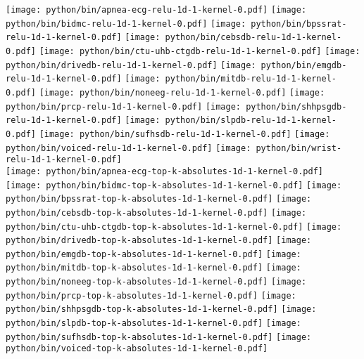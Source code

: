 \documentclass[journal]{IEEEtran}
\begin{document}
\begin{figure*}[!t]
	\centering
	\texttt{[image: python/bin/apnea-ecg-relu-1d-1-kernel-0.pdf]}
	\texttt{[image: python/bin/bidmc-relu-1d-1-kernel-0.pdf]}
	\texttt{[image: python/bin/bpssrat-relu-1d-1-kernel-0.pdf]}
	\texttt{[image: python/bin/cebsdb-relu-1d-1-kernel-0.pdf]}
	\texttt{[image: python/bin/ctu-uhb-ctgdb-relu-1d-1-kernel-0.pdf]}
	\texttt{[image: python/bin/drivedb-relu-1d-1-kernel-0.pdf]}
	\texttt{[image: python/bin/emgdb-relu-1d-1-kernel-0.pdf]}
	\texttt{[image: python/bin/mitdb-relu-1d-1-kernel-0.pdf]}
	\texttt{[image: python/bin/noneeg-relu-1d-1-kernel-0.pdf]}
	\texttt{[image: python/bin/prcp-relu-1d-1-kernel-0.pdf]}
	\texttt{[image: python/bin/shhpsgdb-relu-1d-1-kernel-0.pdf]}
	\texttt{[image: python/bin/slpdb-relu-1d-1-kernel-0.pdf]}
	\texttt{[image: python/bin/sufhsdb-relu-1d-1-kernel-0.pdf]}
	\texttt{[image: python/bin/voiced-relu-1d-1-kernel-0.pdf]}
	\texttt{[image: python/bin/wrist-relu-1d-1-kernel-0.pdf]}
	\\
	\texttt{[image: python/bin/apnea-ecg-top-k-absolutes-1d-1-kernel-0.pdf]}
	\texttt{[image: python/bin/bidmc-top-k-absolutes-1d-1-kernel-0.pdf]}
	\texttt{[image: python/bin/bpssrat-top-k-absolutes-1d-1-kernel-0.pdf]}
	\texttt{[image: python/bin/cebsdb-top-k-absolutes-1d-1-kernel-0.pdf]}
	\texttt{[image: python/bin/ctu-uhb-ctgdb-top-k-absolutes-1d-1-kernel-0.pdf]}
	\texttt{[image: python/bin/drivedb-top-k-absolutes-1d-1-kernel-0.pdf]}
	\texttt{[image: python/bin/emgdb-top-k-absolutes-1d-1-kernel-0.pdf]}
	\texttt{[image: python/bin/mitdb-top-k-absolutes-1d-1-kernel-0.pdf]}
	\texttt{[image: python/bin/noneeg-top-k-absolutes-1d-1-kernel-0.pdf]}
	\texttt{[image: python/bin/prcp-top-k-absolutes-1d-1-kernel-0.pdf]}
	\texttt{[image: python/bin/shhpsgdb-top-k-absolutes-1d-1-kernel-0.pdf]}
	\texttt{[image: python/bin/slpdb-top-k-absolutes-1d-1-kernel-0.pdf]}
	\texttt{[image: python/bin/sufhsdb-top-k-absolutes-1d-1-kernel-0.pdf]}
	\texttt{[image: python/bin/voiced-top-k-absolutes-1d-1-kernel-0.pdf]}

\end{figure*}
\end{document}
